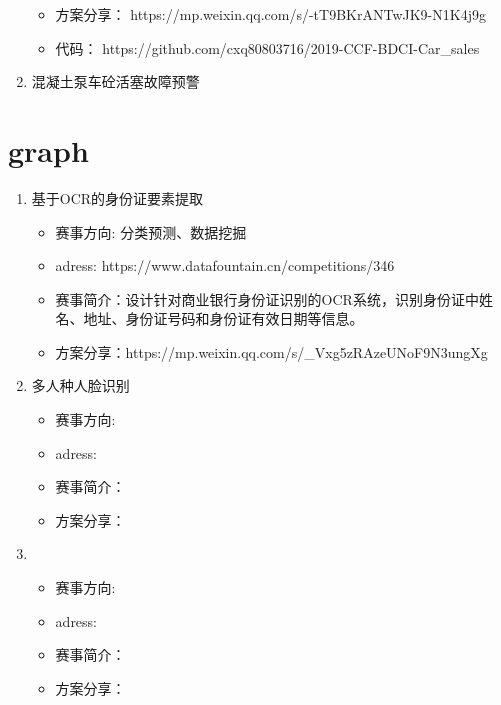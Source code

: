 \documentclass{article}
\begin{document}
\begin{enumerate}
\begin{itemize}
					\item 方案分享： https://mp.weixin.qq.com/s/-tT9BKrANTwJK9-N1K4j9g
					\item 代码： https://github.com/cxq80803716/2019-CCF-BDCI-Car\_sales
				\end{itemize} 
			
			\item 混凝土泵车砼活塞故障预警
			
			
			
		\end{enumerate}	
	\section{graph}
		\begin{enumerate}
			\item 基于OCR的身份证要素提取
				\begin{itemize}
					\item 赛事方向: 分类预测、数据挖掘
					\item adress: https://www.datafountain.cn/competitions/346
					\item 赛事简介：设计针对商业银行身份证识别的OCR系统，识别身份证中姓名、地址、身份证号码和身份证有效日期等信息。
					\item 方案分享：https://mp.weixin.qq.com/s/\_Vxg5zRAzeUNoF9N3ungXg
				\end{itemize} 
			
			\item 多人种人脸识别
				\begin{itemize}
					\item 赛事方向: 
					\item adress: 
					\item 赛事简介：
					\item 方案分享：
				\end{itemize} 
			
			\item 
			\begin{itemize}
				\item 赛事方向: 
				\item adress: 
				\item 赛事简介：
				\item 方案分享：
			\end{itemize} 
			
		\end{enumerate}
	
\end{document}
